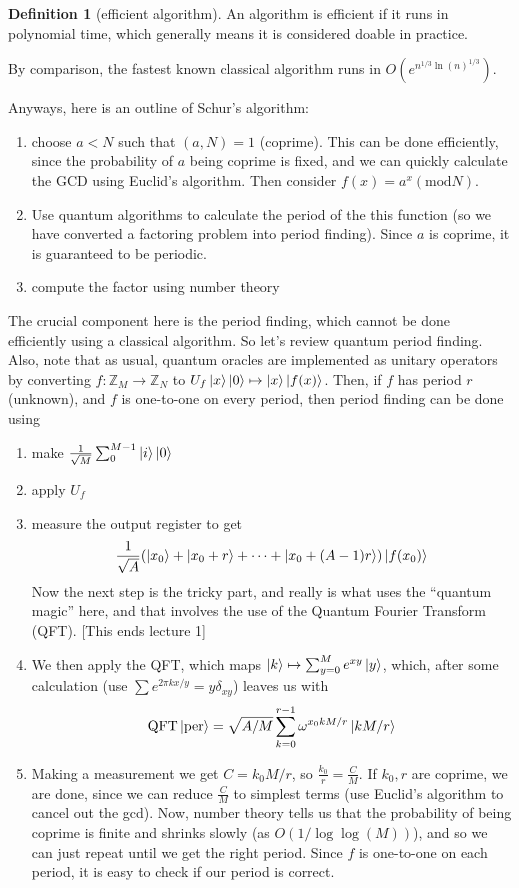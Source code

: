 \documentclass{article}
\theoremstyle{definition}
\newtheorem{definition}{Definition}
\begin{document}
\begin{definition}[efficient algorithm]
  An algorithm is efficient if it runs in polynomial time, which generally means
  it is considered doable in practice.
\end{definition}

By comparison, the fastest known classical algorithm runs in
$O(e^{n^{1/3}\ln(n)^{1/3}})$.

Anyways, here is an outline of Schur's algorithm:

\begin{enumerate}
\item choose $a < N$ such that $(a, N) = 1$ (coprime). This can be done
  efficiently, since the probability of $a$ being coprime is fixed, and we can
  quickly calculate the GCD using Euclid's algorithm. Then consider $f(x) =
  a^x (\text{mod} N)$.
\item Use quantum algorithms to calculate the period of the this function
  (so we have converted a factoring problem into period finding). Since $a$
  is coprime, it is guaranteed to be periodic.
\item compute the factor using number theory
\end{enumerate}

The crucial component here is the period finding, which cannot be done
efficiently using a classical algorithm. So let's review quantum period finding.
Also, note that as usual, quantum oracles are implemented as unitary operators
by converting $f : \mathbb{Z}_M \to \mathbb{Z}_N$ to $U_f \ket{x} \ket{0}
\mapsto \ket{x} \ket{f(x)}$. Then, if $f$ has period $r$ (unknown), and $f$ is
one-to-one on every period, then period finding can be done using

\begin{enumerate}
\item make $\frac{1}{\sqrt{M}} \sum_0^{M - 1} \ket{i}\ket{0}$
\item apply $U_f$
\item measure the output register to get
  $$ \frac{1}{\sqrt{A}} (\ket{x_0} + \ket{x_0 + r} + \dots + \ket{x_0 + (A -
    1)r}) \ket{f(x_0)} $$
  Now the next step is the tricky part, and really is what uses the ``quantum
  magic'' here, and that involves the use of the Quantum Fourier Transform
  (QFT). [This ends lecture 1]
\item We then apply the QFT, which maps $\ket{k} \mapsto \sum_{y = 0}^M e^{xy}
  \ket{y}$, which, after some calculation (use $\sum e^{2\pi kx/y} =
  y\delta_{xy}$) leaves us with
$$ \text{QFT} \ket{\text{per}} = \sqrt{A / M} \sum_{k = 0}^{r - 1} \omega^{x_0 k
M/r} \ket{k M / r} $$
\item Making a measurement we get $C = k_0 M / r$, so $\frac{k_0}{r} =
  \frac{C}{M}$. If $k_0, r$ are coprime, we are done, since we can reduce
  $\frac{C}{M}$ to simplest terms (use Euclid's algorithm to cancel out the
  gcd). Now, number theory tells us that the probability of being coprime is
  finite and shrinks slowly (as $O(1 / \log \log (M))$), and so we can just
  repeat until we get the right period. Since $f$ is one-to-one on each period,
  it is easy to check if our period is correct.
\end{enumerate}
\end{document}
